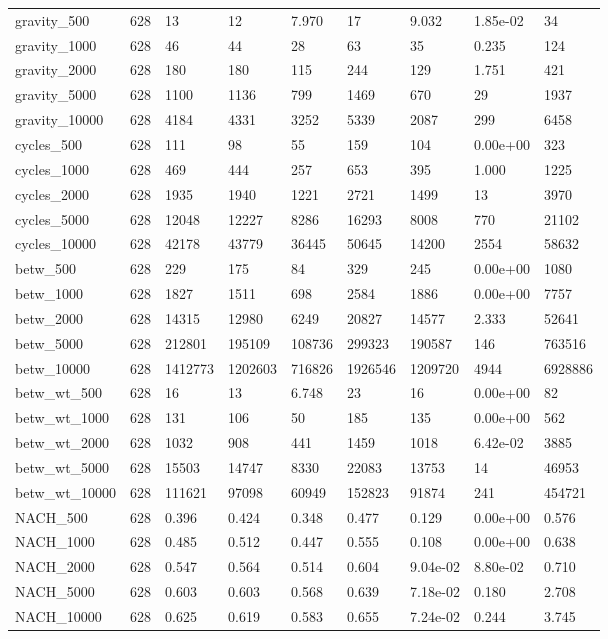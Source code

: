 \begin{tabular}{lrlllllll}
gravity\_500 & 628 & 13 & 12 & 7.970 & 17 & 9.032 & 1.85e-02 & 34 \\
gravity\_1000 & 628 & 46 & 44 & 28 & 63 & 35 & 0.235 & 124 \\
gravity\_2000 & 628 & 180 & 180 & 115 & 244 & 129 & 1.751 & 421 \\
gravity\_5000 & 628 & 1100 & 1136 & 799 & 1469 & 670 & 29 & 1937 \\
gravity\_10000 & 628 & 4184 & 4331 & 3252 & 5339 & 2087 & 299 & 6458 \\
cycles\_500 & 628 & 111 & 98 & 55 & 159 & 104 & 0.00e+00 & 323 \\
cycles\_1000 & 628 & 469 & 444 & 257 & 653 & 395 & 1.000 & 1225 \\
cycles\_2000 & 628 & 1935 & 1940 & 1221 & 2721 & 1499 & 13 & 3970 \\
cycles\_5000 & 628 & 12048 & 12227 & 8286 & 16293 & 8008 & 770 & 21102 \\
cycles\_10000 & 628 & 42178 & 43779 & 36445 & 50645 & 14200 & 2554 & 58632 \\
betw\_500 & 628 & 229 & 175 & 84 & 329 & 245 & 0.00e+00 & 1080 \\
betw\_1000 & 628 & 1827 & 1511 & 698 & 2584 & 1886 & 0.00e+00 & 7757 \\
betw\_2000 & 628 & 14315 & 12980 & 6249 & 20827 & 14577 & 2.333 & 52641 \\
betw\_5000 & 628 & 212801 & 195109 & 108736 & 299323 & 190587 & 146 & 763516 \\
betw\_10000 & 628 & 1412773 & 1202603 & 716826 & 1926546 & 1209720 & 4944 & 6928886 \\
betw\_wt\_500 & 628 & 16 & 13 & 6.748 & 23 & 16 & 0.00e+00 & 82 \\
betw\_wt\_1000 & 628 & 131 & 106 & 50 & 185 & 135 & 0.00e+00 & 562 \\
betw\_wt\_2000 & 628 & 1032 & 908 & 441 & 1459 & 1018 & 6.42e-02 & 3885 \\
betw\_wt\_5000 & 628 & 15503 & 14747 & 8330 & 22083 & 13753 & 14 & 46953 \\
betw\_wt\_10000 & 628 & 111621 & 97098 & 60949 & 152823 & 91874 & 241 & 454721 \\
NACH\_500 & 628 & 0.396 & 0.424 & 0.348 & 0.477 & 0.129 & 0.00e+00 & 0.576 \\
NACH\_1000 & 628 & 0.485 & 0.512 & 0.447 & 0.555 & 0.108 & 0.00e+00 & 0.638 \\
NACH\_2000 & 628 & 0.547 & 0.564 & 0.514 & 0.604 & 9.04e-02 & 8.80e-02 & 0.710 \\
NACH\_5000 & 628 & 0.603 & 0.603 & 0.568 & 0.639 & 7.18e-02 & 0.180 & 2.708 \\
NACH\_10000 & 628 & 0.625 & 0.619 & 0.583 & 0.655 & 7.24e-02 & 0.244 & 3.745 \\
\bottomrule
\end{tabular}
